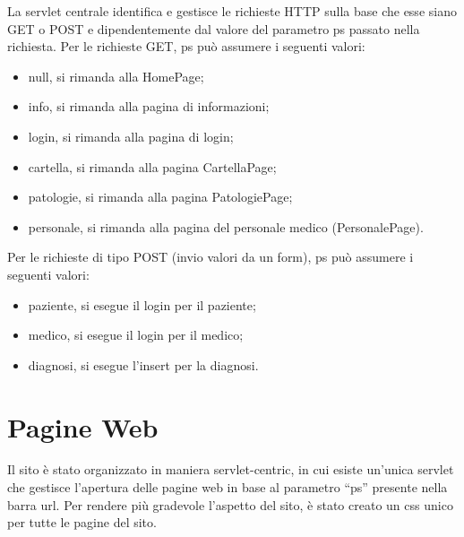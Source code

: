 \documentclass[a4paper,titlepage]{article}
\begin{document}
La servlet centrale identifica e gestisce le richieste HTTP sulla base che esse siano GET o POST e 
dipendentemente dal valore del parametro ps passato nella richiesta.
Per le richieste GET, ps può assumere i seguenti valori:

\begin{itemize}[leftmargin=0.5cm, topsep=0.25cm, itemsep=0.2cm]

\item null, si rimanda alla HomePage;

\item info, si rimanda alla pagina di informazioni;

\item login, si rimanda alla pagina di login;

\item cartella, si rimanda alla pagina CartellaPage;

\item patologie, si rimanda alla pagina PatologiePage;

\item personale, si rimanda alla pagina del personale medico (PersonalePage). 

\end{itemize}


Per le richieste di tipo POST (invio valori da un form), ps può assumere i seguenti valori:

\begin{itemize}[leftmargin=0.5cm, topsep=0.25cm, itemsep=0.2cm]

\item paziente, si esegue il login per il paziente;

\item medico, si esegue il login per il medico;

\item diagnosi, si esegue l'insert per la diagnosi.

\end{itemize}

\part{Pagine Web}

Il sito è stato organizzato in maniera servlet-centric, in cui esiste un'unica servlet che gestisce l'apertura delle pagine web in base al parametro ``ps'' presente nella barra url. Per rendere più gradevole l'aspetto del sito, è stato creato un css unico per tutte le pagine del sito.
\end{document}
